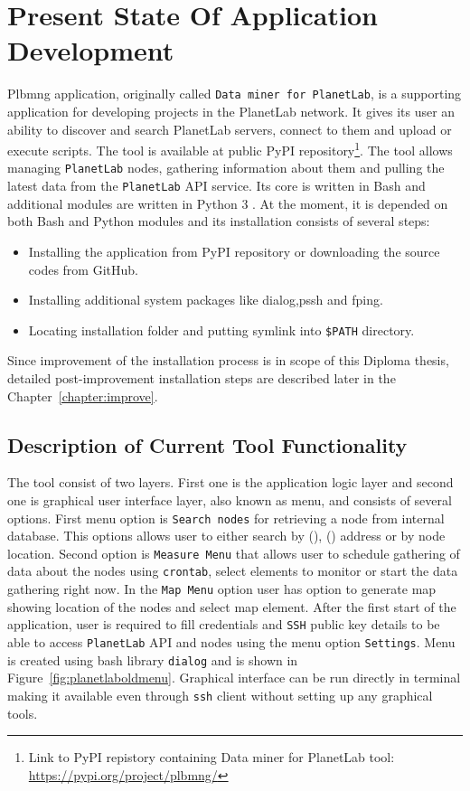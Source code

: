 \chapter{Present State Of Application Development}
\label{chapter:plbmng}
Plbmng application, originally called \texttt{Data miner for PlanetLab}, is a supporting application for developing projects in the PlanetLab network. It gives its user an ability to discover and search PlanetLab servers, connect to them and upload or execute scripts. The tool is available at public PyPI repository\footnote{Link to PyPI repistory containing Data miner for PlanetLab tool: \url{https://pypi.org/project/plbmng/}}. The tool allows managing \texttt{PlanetLab} nodes, gathering information about them and pulling the latest data from the \texttt{PlanetLab} API service. Its core is written in Bash and additional modules are written in Python 3 \cite{suba1}. At the moment, it is depended on both Bash and Python modules and its installation consists of several steps:
\begin{itemize}
	\item Installing the application from PyPI repository or downloading the source codes from GitHub.
	\item Installing additional system packages like dialog,pssh and fping.
	\item Locating installation folder and putting symlink into \texttt{\$PATH} directory.
\end{itemize}
Since improvement of the installation process is in scope of this Diploma thesis, detailed post-improvement installation steps are described later in the Chapter~\ref{chapter:improve}.
\section{Description of Current Tool Functionality}
The tool consist of two layers. First one is the application logic layer and second one is graphical user interface layer, also known as menu, and consists of several options. First menu option is \texttt{Search nodes} for retrieving a node from internal database. This options allows user to either search by  (),  () address or by node location. Second option is \texttt{Measure Menu} that allows user to schedule gathering of data about the nodes using \texttt{crontab}, select elements to monitor or start the data gathering right now. In the \texttt{Map Menu} option user has option to generate map showing location of the nodes and select map element. After the first start of the application, user is required to fill credentials and \texttt{SSH} public key details to be able to access \texttt{PlanetLab} API and nodes using the menu option \texttt{Settings}. Menu is created using bash library \texttt{dialog} and is shown in Figure~\ref{fig:planetlaboldmenu}. Graphical interface can be run directly in terminal making it available even through \texttt{ssh} client without setting up any graphical tools.

